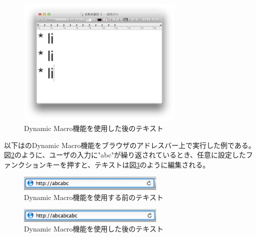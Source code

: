 \begin{figure}[H]
\centerline{\includegraphics[width=80mm,bb=0 0 360 190]{figures/dynamic2.png}}
\caption{Dynamic Macro機能を使用した後のテキスト}
\label{dynamic2}
\end{figure}


以下は{\system}のDynamic Macro機能をブラウザのアドレスバー上で実行した例である。
図\ref{dynamic3}のように、ユーザの入力に"abc"が繰り返されているとき、任意に設定したファンクションキーを押すと、テキストは図\ref{dynamic4}のように編集される。

\begin{figure}[H]
\centerline{\includegraphics[width=70mm,bb=0 0 360 50]{figures/dynamic3.png}}
\caption{Dynamic Macro機能を使用する前のテキスト}
\label{dynamic3}
\end{figure}

\begin{figure}[H]
\centerline{\includegraphics[width=70mm,bb=0 0 360 50]{figures/dynamic4.png}}
\caption{Dynamic Macro機能を使用した後のテキスト}
\label{dynamic4}
\end{figure}



